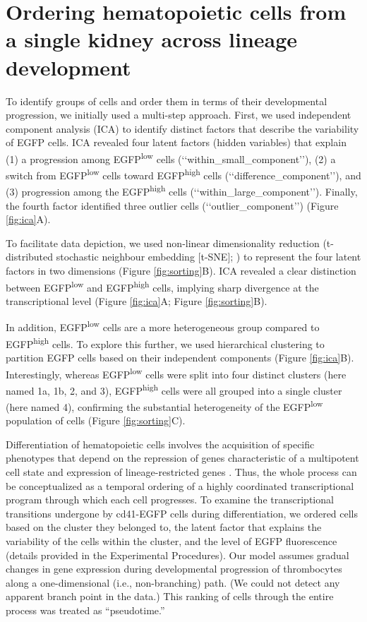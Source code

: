 \section{Ordering hematopoietic cells from a single kidney across lineage development}

\begin{sloppypar}
To identify groups of cells and order them in terms of their developmental progression, we initially used a multi-step approach. First, we used independent component analysis (ICA) to identify distinct factors that describe the variability of EGFP cells. ICA revealed four latent factors (hidden variables) that explain (1) a progression among EGFP\textsuperscript{low} cells (‘‘within\_small\_component’’), (2) a switch from EGFP\textsuperscript{low} cells toward EGFP\textsuperscript{high} cells (‘‘difference\_component’’), and (3) progression among the EGFP\textsuperscript{high} cells (‘‘within\_large\_component’’). Finally, the fourth factor identified three outlier cells (‘‘outlier\_component’’) (Figure \ref{fig:ica}A).
\end{sloppypar}

To facilitate data depiction, we used non-linear dimensionality reduction (t-distributed stochastic neighbour embedding [t-SNE];  \cite{Van_der_Maaten2008-lh}) to represent the four latent factors in two dimensions (Figure \ref{fig:sorting}B). ICA revealed a clear distinction between EGFP\textsuperscript{low} and EGFP\textsuperscript{high} cells, implying sharp divergence at the transcriptional level (Figure \ref{fig:ica}A; Figure \ref{fig:sorting}B).

In addition, EGFP\textsuperscript{low} cells are a more heterogeneous group compared to EGFP\textsuperscript{high} cells. To explore this further, we used hierarchical clustering to partition EGFP cells based on their independent components (Figure \ref{fig:ica}B). Interestingly, whereas EGFP\textsuperscript{low} cells were split into four distinct clusters (here named 1a, 1b, 2, and 3), EGFP\textsuperscript{high} cells were all grouped into a single cluster (here named 4), confirming the substantial heterogeneity of the EGFP\textsuperscript{low} population of cells (Figure \ref{fig:sorting}C).

Differentiation of hematopoietic cells involves the acquisition of specific phenotypes that depend on the repression of genes characteristic of a multipotent cell state and expression of lineage-restricted genes  \cite{Seita2010-mk}. Thus, the whole process can be conceptualized as a temporal ordering of a highly coordinated transcriptional program through which each cell progresses. To examine the transcriptional transitions undergone by cd41-EGFP cells during differentiation, we ordered cells based on the cluster they belonged to, the latent factor that explains the variability of the cells within the cluster, and the level of EGFP fluorescence (details provided in the Experimental Procedures). Our model assumes gradual changes in gene expression during developmental progression of thrombocytes along a one-dimensional (i.e., non-branching) path. (We could not detect any apparent branch point in the data.) This ranking of cells through the entire process was treated as ``pseudotime.''

